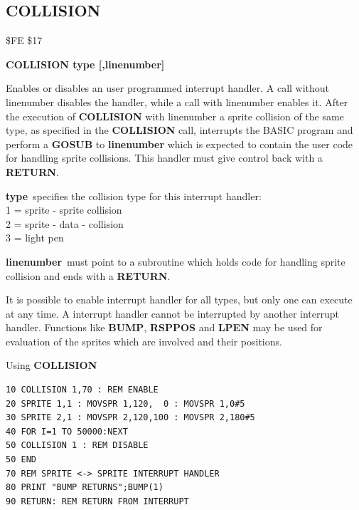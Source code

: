 \subsection{COLLISION}
\begin{description}[leftmargin=2cm,style=nextline]
\item [Token:] \$FE \$17
\item [Format:] {\bf COLLISION type [,linenumber]}
\item [Usage:]  Enables or disables
                an user programmed interrupt handler.
                A call without linenumber disables the handler,
                while a call with linenumber enables it.
                After the execution of {\bf COLLISION} with
                linenumber a sprite collision of the same type,
                as specified in the {\bf COLLISION} call,
                interrupts the BASIC program and perform a {\bf GOSUB}
                to {\bf linenumber} which is expected to contain
                the user code for handling sprite collisions.
                This handler must give control back with a {\bf RETURN}.

                {\bf type} specifies the collision type for
                this interrupt handler: \\
                1 = sprite - sprite collision \\
                2 = sprite - data - collision \\
                3 = light pen

                {\bf linenumber} must point to a subroutine
                which holds code for handling sprite collision
                and ends with a {\bf RETURN}.

\item [Remarks:] It is possible to enable interrupt handler for
               all types, but only one can execute at any time.
               A interrupt handler cannot be interrupted by another
               interrupt handler.
               Functions like {\bf BUMP}, {\bf RSPPOS} and
               {\bf LPEN} may be used for evaluation of the sprites
               which are involved and their positions.

\item [Example:] Using {\bf COLLISION}
\begin{tcolorbox}[colback=black,coltext=white]
\verbatimfont{\codefont}
\begin{verbatim}
10 COLLISION 1,70 : REM ENABLE
20 SPRITE 1,1 : MOVSPR 1,120,  0 : MOVSPR 1,0#5
30 SPRITE 2,1 : MOVSPR 2,120,100 : MOVSPR 2,180#5
40 FOR I=1 TO 50000:NEXT
50 COLLISION 1 : REM DISABLE
50 END
70 REM SPRITE <-> SPRITE INTERRUPT HANDLER
80 PRINT "BUMP RETURNS";BUMP(1)
90 RETURN: REM RETURN FROM INTERRUPT
\end{verbatim}
\end{tcolorbox}
\end{description}

